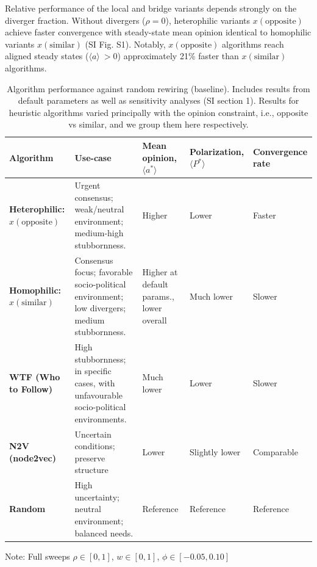 \documentclass[unnumsec,webpdf,contemporary,large]{oup-authoring-template}%
\theoremstyle{thmstyleone}%
\theoremstyle{thmstyletwo}%
\theoremstyle{thmstylethree}%
\begin{document}
Relative performance of the local and bridge variants depends strongly on the diverger fraction. Without divergers ($\rho = 0$), heterophilic variants $x(\text{opposite})$ achieve faster convergence with steady-state mean opinion identical to homophilic variants $x(\text{similar})$ (SI Fig. S1). Notably, $x(\text{opposite})$ algorithms reach aligned steady states ($\langle a \rangle \ > 0$) approximately 21\% faster than $x(\text{similar})$ algorithms.

\begin{table}[t]
\centering
\caption{Algorithm performance against random rewiring (baseline). Includes results from default parameters as well as sensitivity analyses (SI section 1). Results for heuristic algorithms varied principally with the opinion constraint, i.e., opposite vs similar, and we group them here respectively.}
\label{tab:algorithm_comparison}
\small
\begin{tabular}{lp{2.5cm}p{1.8cm}p{1.7cm}p{1.6cm}}
\toprule
\textbf{Algorithm} & \textbf{Use-case}& \textbf{Mean opinion, $\langle a^* \rangle $}& \textbf{Polarization, $\langle P^* \rangle $}& \textbf{Convergence rate}\\
\midrule
\textbf{Heterophilic: $x(\text{opposite})$}&
Urgent consensus; weak/neutral environment; medium-high stubbornness.&
Higher &
Lower &
Faster \\
\midrule
\textbf{Homophilic: $x(\text{similar})$}&
Consensus focus; favorable socio-political environment; low divergers; medium stubbornness.&
Higher at default params., lower overall&
Much lower &
Slower \\
\midrule
\textbf{WTF (Who to Follow)}&
High stubbornness; in specific cases, with unfavourable socio-political environments.&
Much lower &
Lower &
Slower \\
\midrule
\textbf{N2V (node2vec)} &
Uncertain conditions; preserve structure &
Lower &
Slightly lower &
Comparable \\
\midrule
\textbf{Random} &
High uncertainty; neutral environment; balanced needs.&
Reference &
Reference &
Reference \\
\bottomrule
\end{tabular}
\vspace{2mm}
\par\noindent\footnotesize{Note: Full sweeps $\rho \in [0, 1]$, $w \in [0, 1]$, $\phi \in [-0.05, 0.10]$}
\end{table}
\end{document}
